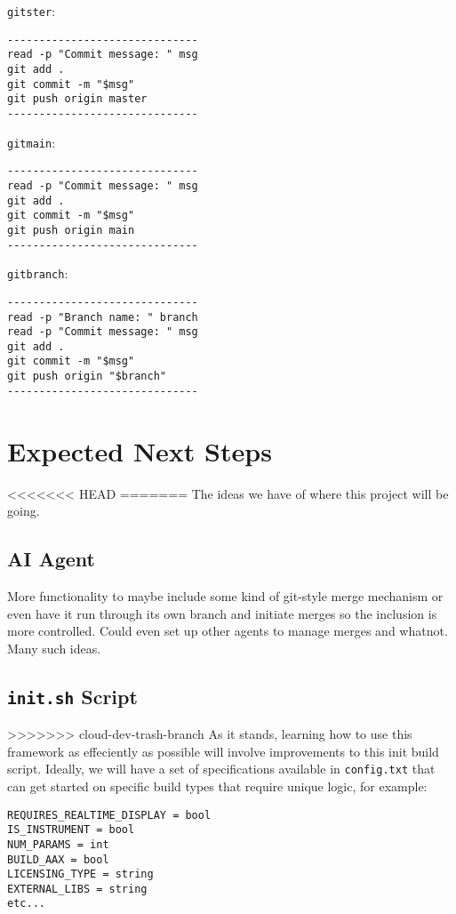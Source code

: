 \documentclass[twocolumn,natbib]{svjour3}        %
\begin{document}
\vspace{1em}

\texttt{gitster}:
\begin{verbatim}
------------------------------
read -p "Commit message: " msg
git add .
git commit -m "$msg"
git push origin master
------------------------------
\end{verbatim}

\vspace{1em}

\texttt{gitmain}:
\begin{verbatim}
------------------------------
read -p "Commit message: " msg
git add .
git commit -m "$msg"
git push origin main
------------------------------
\end{verbatim}

\vspace{1em}

\texttt{gitbranch}:
\begin{verbatim}
------------------------------
read -p "Branch name: " branch
read -p "Commit message: " msg
git add .
git commit -m "$msg"
git push origin "$branch"
------------------------------
\end{verbatim}
\section{Expected Next Steps}
<<<<<<< HEAD
=======
The ideas we have of where this project will be going.
\subsection{AI Agent}
More functionality to maybe include some kind of git-style merge mechanism or even have it run through its own branch and initiate merges so the inclusion is more controlled. Could even set up other agents to manage merges and whatnot. Many such ideas.
\subsection{\texttt{init.sh} Script}
>>>>>>> cloud-dev-trash-branch
As it stands, learning how to use this framework as effeciently as possible will involve improvements to this init build script. Ideally, we will have a set of specifications available in \texttt{config.txt} that can get started on specific build types that require unique logic, for example:
\begin{verbatim}
REQUIRES_REALTIME_DISPLAY = bool
IS_INSTRUMENT = bool
NUM_PARAMS = int
BUILD_AAX = bool
LICENSING_TYPE = string
EXTERNAL_LIBS = string
etc...
\end{verbatim}




\phantom{.}

\end{document}
